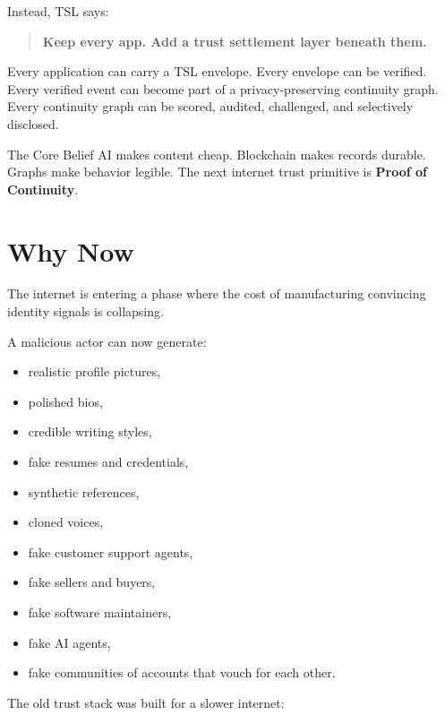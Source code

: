 \documentclass[11pt]{article}
\newcommand{\TSL}{\textsc{TSL}}
\begin{document}
Instead, \TSL{} says:

\begin{quote}
\textbf{Keep every app. Add a trust settlement layer beneath them.}
\end{quote}

Every application can carry a \TSL{} envelope. Every envelope can be verified. Every verified event can become part of a privacy-preserving continuity graph. Every continuity graph can be scored, audited, challenged, and selectively disclosed.

\begin{principlebox}{The Core Belief}
AI makes content cheap. Blockchain makes records durable. Graphs make behavior legible. The next internet trust primitive is \textbf{Proof of Continuity}.
\end{principlebox}

\section{Why Now}

The internet is entering a phase where the cost of manufacturing convincing identity signals is collapsing.

A malicious actor can now generate:

\begin{itemize}
    \item realistic profile pictures,
    \item polished bios,
    \item credible writing styles,
    \item fake resumes and credentials,
    \item synthetic references,
    \item cloned voices,
    \item fake customer support agents,
    \item fake sellers and buyers,
    \item fake software maintainers,
    \item fake AI agents,
    \item fake communities of accounts that vouch for each other.
\end{itemize}

The old trust stack was built for a slower internet:
\end{document}
